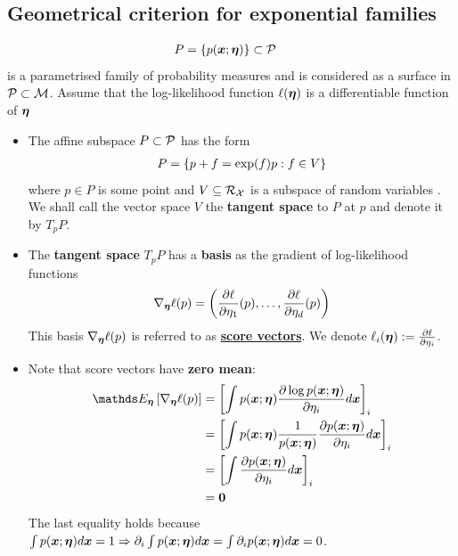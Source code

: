 \documentclass[11pt]{article}
\begin{document}
\subsection{Geometrical criterion for exponential families}
\begin{align*}
P &= \left\{p(\boldsymbol{x}; \boldsymbol{\eta})\right\} \subset {\mathcal P}
\end{align*} is a parametrised family of probability measures and is considered as a surface in $ {\mathcal P} \subset {\mathcal M}$. Assume that the log-likelihood function $\ell(\boldsymbol{\eta})$ is a differentiable function of $\boldsymbol{\eta}$
\begin{itemize}
\item The affine subspace $P \subset {\mathcal P}$ has the form 
\begin{align}
P = \left\{p + f= \exp(f)p: f\in V\right\}
\end{align} where $p \in P$ is some point and $V \subseteq {\mathcal R}_{{\mathcal X}}$ is a subspace of random variables . We shall call the vector space $V$ the \textbf{tangent space} to $P$ at $p$ and denote it by $T_{p}P$.

\item  \begin{proposition}
The \textbf{tangent space} $T_{p}P$ has a \textbf{basis} as the gradient of log-likelihood functions
\begin{align*}
\nabla_{\boldsymbol{\eta}}{\ell}(p) = \left(\frac{\partial \ell}{ \partial \eta_1}(p),\ldots, \frac{\partial \ell}{ \partial \eta_d}(p)\right)
\end{align*} This basis $\nabla_{\boldsymbol{\eta}}{\ell}(p)$ is referred to as \underline{\textbf{score vectors}}. We denote $\ell_i(\boldsymbol{\eta}) := \frac{\partial \ell}{ \partial \eta_i}$.
 \end{proposition}
 
\item Note that score vectors have \textbf{zero mean}:
\begin{align}
\E{\mb{\eta}}{\grad{\mb{\eta}}{\ell}(p)} &= \brac{\int p(\mb{x}; \mb{\eta}) \partdiff{\log p(\mb{x}; \mb{\eta})}{\eta_i} d\mb{x}}_i  \nonumber\\
&= \brac{\int p(\mb{x}; \mb{\eta})\frac{1}{p(\mb{x}; \mb{\eta})} \partdiff{p(\mb{x}; \mb{\eta})}{\eta_i} d\mb{x}}_i  \nonumber\\
&= \brac{\int \partdiff{p(\mb{x}; \mb{\eta})}{\eta_i} d\mb{x}}_i \nonumber\\
&= \mb{0} \label{eqn: score_function_zero_mean}
\end{align} The last equality holds because $\int p(\boldsymbol{x}; \boldsymbol{\eta}) d\boldsymbol{x} = 1\Rightarrow \partial_i \int p(\boldsymbol{x}; \boldsymbol{\eta}) d\boldsymbol{x} =\int \partial_i p(\boldsymbol{x}; \boldsymbol{\eta}) d\boldsymbol{x}  =  0$.


\end{itemize}
\end{document}
